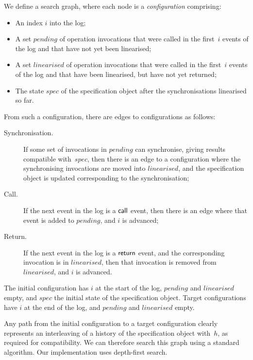 We define a search graph, where each node is a \emph{configuration}
comprising:
%
\begin{itemize}
\item An index $i$ into the log;

\item A set $pending$ of operation invocations that were called in the
  first~$i$ events of the log and that have not yet been linearised;

\item A set $linearised$ of operation invocations that were called in the
  first~$i$ events of the log and that have been linearised, but have not yet
  returned;

\item The state $spec$ of the specification object after the synchronisations
  linearised so far.
\end{itemize}
%
From such a configuration, there are edges to configurations as follows:
%
\def\edgeFont#1{\textsf{#1}}
\begin{description}
\item[\edgeFont{Synchronisation}.] If some set of invocations in $pending$ can
  synchronise, giving results compatible with~$spec$, then there is an edge to
  a configuration where the synchronising invocations are moved into
  $linearised$, and the specification object is updated corresponding to the
  synchronisation;

\item[\edgeFont{Call}.] If the next event in the log is a $\mathsf{call}$ event, then
  there is an edge where that event is added to $pending$, and $i$ is
  advanced;

\item[\edgeFont{Return}.] If the next event in the log is a $\mathsf{return}$ event,
  and the corresponding invocation is in $linearised$, then that invocation is
  removed from $linearised$, and $i$ is advanced.
\end{description}
%
The initial configuration has $i$ at the start of the log, $pending$ and
$linearised$ empty, and $spec$ the initial state of the specification object.
Target configurations have $i$ at the end of the log, and $pending$ and
$linearised$ empty.

Any path from the initial configuration to a target configuration clearly
represents an interleaving of a history of the specification object with~$h$,
as required for compatibility.  We can therefore search this graph using a
standard algorithm.  Our implementation uses depth-first search.

